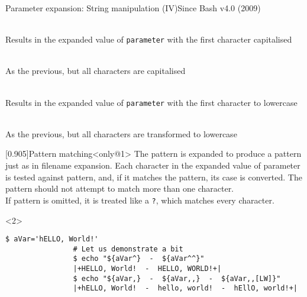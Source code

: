 \begin{frame}[fragile]{Parameter expansion: String manipulation (IV)}{Since Bash v4.0 (2009)}
    \vspace{-3mm}
    \begin{description}
        \item[First uppercase:] \\
            {\small
                Results in the expanded value of \texttt{parameter} with the first character capitalised
            }
        \item[All uppercase:] \\
            {\small
                As the previous, but all characters are capitalised
            }
        \item[First lowercase:] \\
            {\small
                Results in the expanded value of \texttt{parameter} with the first character to lowercase
            }
        \item[All lowercase:] \\
            {\small
                As the previous, but all characters are transformed to lowercase
            }
    \end{description}
    \begin{overlayarea}{\textwidth}{0.4\textheight}
        \begin{varblock}{}[0.905\textwidth]{Pattern matching}<only@1>
            \small
            The pattern is expanded to produce a pattern just as in filename expansion.
            Each character in the expanded value of parameter is tested against pattern, and, if it matches the pattern, its case is converted.
            \alert{The pattern should not attempt to match more than one character.}\\
            If pattern is omitted, it is treated like a \texttt{?}, which matches every character.
        \end{varblock}
        \begin{onlyenv}<2>
            \begin{lstlisting}[style=MyBash, style=oddnumbers, aboveskip=5mm]
                $ aVar='hELLO, World!'
                # Let us demonstrate a bit
                $ echo "${aVar^}  -  ${aVar^^}"
                |+HELLO, World!  -  HELLO, WORLD!+|
                $ echo "${aVar,}  -  ${aVar,,}  -  ${aVar,,[LW]}"
                |+hELLO, World!  -  hello, world!  -  hEllO, world!+|
            \end{lstlisting}
        \end{onlyenv}
    \end{overlayarea}
\end{frame}
